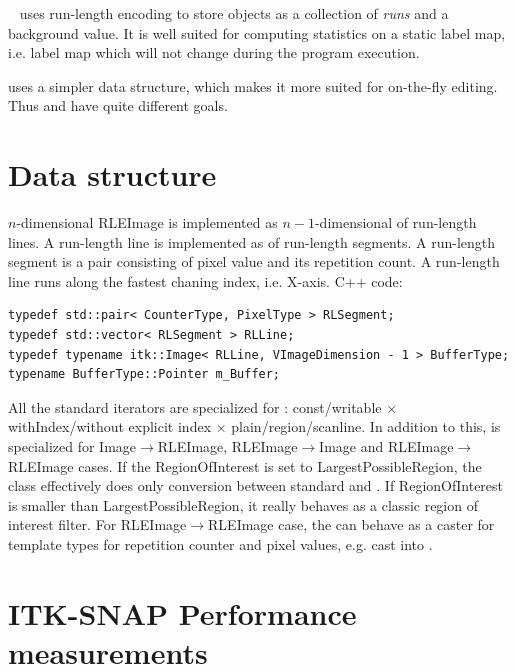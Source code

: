 \documentclass{InsightArticle}
\begin{document}
~\cite{Lehmann2007} uses run-length encoding to store objects
as a collection of \textit{runs} and a background value.
It is well suited for computing statistics on a static label map,
i.e. label map which will not change during the program execution.

 uses a simpler data structure, which makes it more suited
for on-the-fly editing.
Thus  and  have quite different goals.


\section{Data structure}

$n$-dimensional RLEImage is implemented as $n-1$-dimensional  of run-length lines.
A run-length line is implemented as  of run-length segments.
A run-length segment is a pair consisting of pixel value and its repetition count.
A run-length line runs along the fastest chaning index, i.e. X-axis. C++ code:

\begin{verbatim}
typedef std::pair< CounterType, PixelType > RLSegment;
typedef std::vector< RLSegment > RLLine;
typedef typename itk::Image< RLLine, VImageDimension - 1 > BufferType;
typename BufferType::Pointer m_Buffer;
\end{verbatim}

All the standard iterators are specialized for :
const/writable $\times$ withIndex/without explicit index $\times$ plain/region/scanline.
In addition to this,  is specialized for
Image$\rightarrow$RLEImage, RLEImage$\rightarrow$Image and RLEImage$\rightarrow$RLEImage cases.
If the RegionOfInterest is set to LargestPossibleRegion, the class effectively
does only conversion between standard  and .
If RegionOfInterest is smaller than LargestPossibleRegion,
it really behaves as a classic region of interest filter.
For RLEImage$\rightarrow$RLEImage case, the 
can behave as a caster for template types for repetition counter and pixel values,
e.g. cast  into .

\section{ITK-SNAP Performance measurements}
\end{document}
